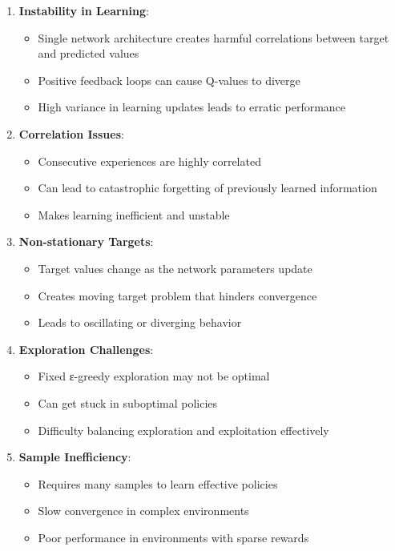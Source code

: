 \documentclass[12pt]{article}
\begin{document}
{{{\begin{enumerate}
    \item \textbf{Instability in Learning}:
    \begin{itemize}
        \item Single network architecture creates harmful correlations between target and predicted values
        \item Positive feedback loops can cause Q-values to diverge
        \item High variance in learning updates leads to erratic performance
    \end{itemize}
    
    \item \textbf{Correlation Issues}:
    \begin{itemize}
        \item Consecutive experiences are highly correlated
        \item Can lead to catastrophic forgetting of previously learned information
        \item Makes learning inefficient and unstable
    \end{itemize}
    
    \item \textbf{Non-stationary Targets}:
    \begin{itemize}
        \item Target values change as the network parameters update
        \item Creates moving target problem that hinders convergence
        \item Leads to oscillating or diverging behavior
    \end{itemize}
    
    \item \textbf{Exploration Challenges}:
    \begin{itemize}
        \item Fixed ε-greedy exploration may not be optimal
        \item Can get stuck in suboptimal policies
        \item Difficulty balancing exploration and exploitation effectively
    \end{itemize}
    
    \item \textbf{Sample Inefficiency}:
    \begin{itemize}
        \item Requires many samples to learn effective policies
        \item Slow convergence in complex environments
        \item Poor performance in environments with sparse rewards
    \end{itemize}
\end{enumerate}

}}}
\end{document}
